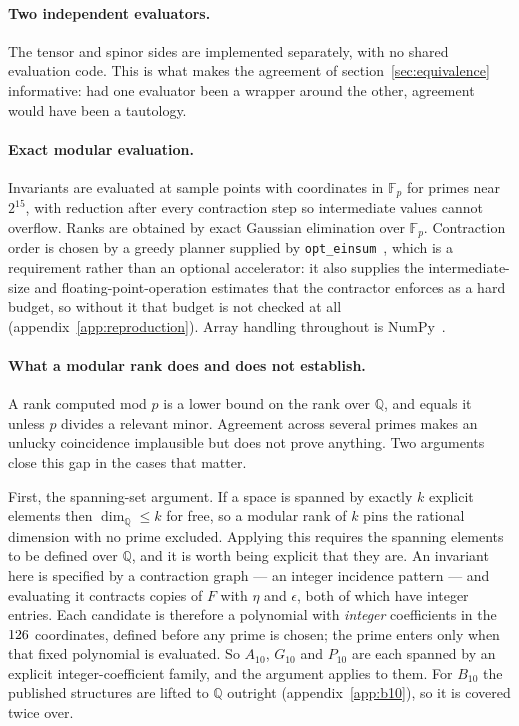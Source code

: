 \documentclass[11pt,a4paper]{article}
\theoremstyle{definition}
\theoremstyle{remark}
\newcommand{\Ften}{A_{10}}
\newcommand{\Bten}{B_{10}}
\newcommand{\Pten}{P_{10}}
\newcommand{\Gten}{G_{10}}
\newcommand{\Fp}{\mathbb{F}_p}
\newcommand{\Q}{\mathbb{Q}}
\begin{document}
\paragraph{Two independent evaluators.}
The tensor and spinor sides are implemented separately, with no shared
evaluation code. This is what makes the agreement of section~\ref{sec:equivalence}
informative: had one evaluator been a wrapper around the other, agreement would
have been a tautology.

\paragraph{Exact modular evaluation.}
Invariants are evaluated at sample points with coordinates in $\Fp$ for primes
near $2^{15}$, with reduction after every contraction step so intermediate values
cannot overflow. Ranks are obtained by exact Gaussian elimination over $\Fp$.
Contraction order is chosen by a greedy planner supplied by
\texttt{opt\_einsum}~\cite{Smith:2018}, which is a requirement rather than an
optional accelerator: it also supplies the intermediate-size and
floating-point-operation estimates that the contractor enforces as a hard
budget, so without it that budget is not checked at all
(appendix~\ref{app:reproduction}). Array handling throughout is
NumPy~\cite{Harris:2020}.

\paragraph{What a modular rank does and does not establish.}
A rank computed mod $p$ is a lower bound on the rank over $\Q$, and equals it
unless $p$ divides a relevant minor. Agreement across several primes makes an
unlucky coincidence implausible but does not prove anything. Two arguments close
this gap in the cases that matter.

First, the spanning-set argument. If a space is spanned by exactly $k$ explicit
elements then $\dim_\Q \le k$ for free, so a modular rank of $k$ pins the
rational dimension with no prime excluded. Applying this requires the spanning
elements to be defined over $\Q$, and it is worth being explicit that they are.
An invariant here is specified by a contraction graph --- an integer incidence
pattern --- and evaluating it contracts copies of $F$ with $\eta$ and $\epsilon$,
both of which have integer entries. Each candidate is therefore a polynomial with
\emph{integer} coefficients in the $126$ coordinates, defined
before any prime is chosen; the prime enters only when that fixed polynomial is
evaluated. So $\Ften$, $\Gten$ and $\Pten$ are each spanned by an explicit
integer-coefficient family, and the argument applies to them. For $\Bten$ the
published structures are lifted to $\Q$ outright (appendix~\ref{app:b10}), so it
is covered twice over.
\end{document}
